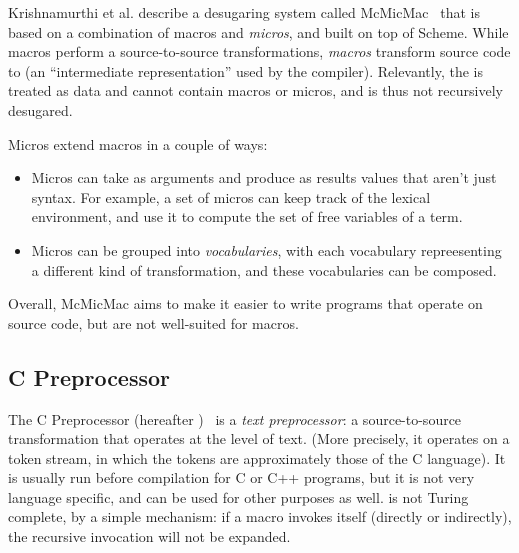 Krishnamurthi et al. describe a desugaring system called
McMicMac~\cite{sk:mcmicmac} that is based on a combination of macros
and \emph{micros}, and built on top of Scheme. While macros perform a
source-to-source transformations, \emph{macros} transform source code
to  (an ``intermediate representation'' used by the compiler).
Relevantly, the  is treated as data and cannot contain macros
or micros, and is thus not recursively desugared.

Micros extend macros in a couple of ways:
\begin{itemize}
  \item Micros can take as arguments and produce as results values
    that aren't just syntax. For example, a set of micros can keep
    track of the lexical environment, and use it to compute the set of
    free variables of a term.
  \item Micros can be grouped into \emph{vocabularies}, with each
    vocabulary repreesenting a different kind of transformation, and
    these vocabularies can be composed.
\end{itemize}

Overall, McMicMac aims to make it easier to write programs that
operate on source code, but are not well-suited for macros.


\subsection{C Preprocessor} \label{sec:taxonomy-cpre}

The C Preprocessor (hereafter )~\cite{cpp} is a \emph{text
  preprocessor}: a source-to-source transformation that operates at
the level of text. (More precisely, it operates on a token stream, in
which the tokens are approximately those of the C language). It is
usually run before compilation for C or C++ programs, but it is not
very language specific, and can be used for other purposes as well.
 is not Turing complete, by a simple mechanism: if a macro
invokes itself (directly or indirectly), the recursive invocation
will not be expanded.


